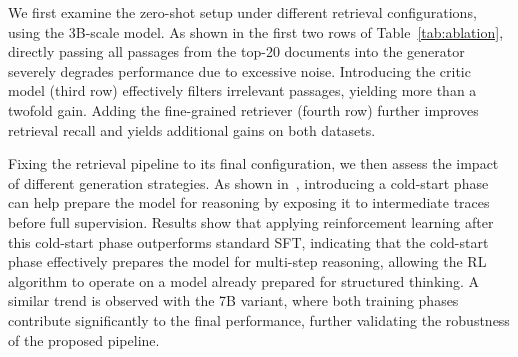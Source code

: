 We first examine the zero-shot setup under different retrieval configurations, using the 3B-scale model. As shown in the first two rows of Table~\ref{tab:ablation}, directly passing all passages from the top-20 documents into the generator severely degrades performance due to excessive noise. Introducing the critic model (third row) effectively filters irrelevant passages, yielding more than a twofold gain. Adding the fine-grained retriever (fourth row) further improves retrieval recall and yields additional gains on both datasets.

Fixing the retrieval pipeline to its final configuration, we then assess the impact of different generation strategies. As shown in~\cite{guo2025deepseek}, introducing a cold-start phase can help prepare the model for reasoning by exposing it to intermediate traces before full supervision. Results show that applying reinforcement learning after this cold-start phase outperforms standard SFT, indicating that the cold-start phase effectively prepares the model for multi-step reasoning, allowing the RL algorithm to operate on a model already prepared for structured thinking. 
A similar trend is observed with the 7B variant, where both training phases contribute significantly to the final performance, further validating the robustness of the proposed \ours pipeline.
